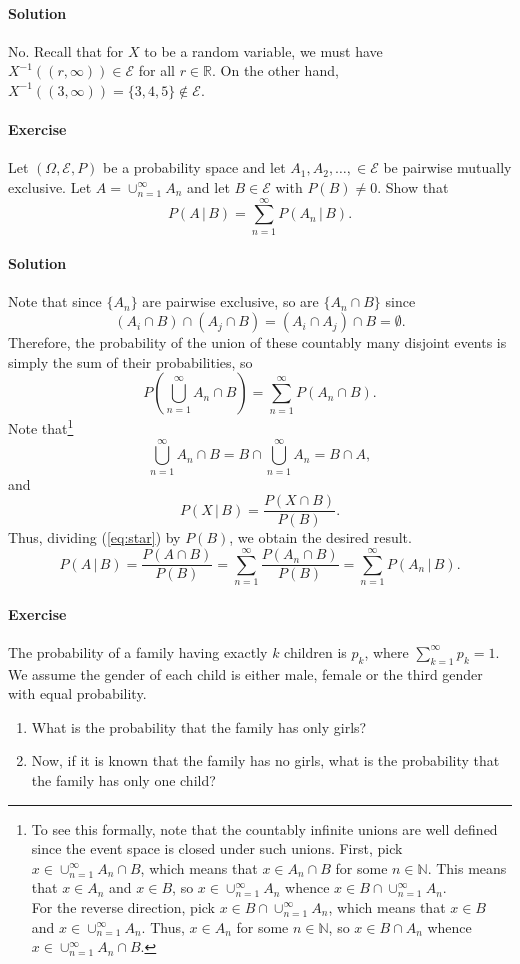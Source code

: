 \documentclass[10pt]{article}
\newcounter{prob}
\def\problem{\stepcounter{prob}\paragraph{Exercise \arabic{prob}}}
\def\solution{\paragraph{Solution}}
\begin{document}
        \solution No. Recall that for $X$ to be a random variable, we must have
        $X^{-1}((r, \infty)) \in \mathcal{E}$ for all $r \in \mathbb{R}$. On the
        other hand, $X^{-1}((3, \infty)) = \{3, 4, 5\} \notin \mathcal{E}$.

        \problem Let $(\Omega, \mathcal{E}, P)$ be a probability space and let $A_1,
        A_2, \dots, \in \mathcal{E}$ be pairwise mutually exclusive. Let $A =
        \cup_{n = 1}^\infty A_n$ and let $B \in \mathcal{E}$ with $P(B) \neq 0$.
        Show that \[
            P(A\,|\, B) = \sum_{n = 1}^\infty P(A_n\,|\,B).
        \] 
        
        \solution Note that since $\{A_n\}$ are pairwise exclusive, so are $\{A_n
        \cap B\}$ since \[
            (A_i \cap B) \cap (A_j \cap B) = (A_i \cap A_j) \cap B = \emptyset.
        \] Therefore, the probability of the union of these countably many disjoint
        events is simply the sum of their probabilities, so \[
            P\left(\bigcup_{n = 1}^\infty A_n \cap B\right) = \sum_{n = 1}^\infty
            P(A_n \cap B). \tag{\star}\label{eq:star}
            \] Note that\footnote{
                To see this formally, note that the countably infinite unions are
                well defined since the event space is closed under such unions.
                First, pick $x \in \cup_{n = 1}^\infty A_n \cap B$, which means that
                $x \in A_n \cap B$ for some $n \in \mathbb{N}$. This means that $x
                \in A_n$ and $x \in B$, so $x \in \cup_{n = 1}^\infty A_n$ whence $x
                \in B \cap \cup_{n = 1}^\infty A_n$. \\

                For the reverse direction, pick $x \in B \cap \cup_{n = 1}^\infty
                A_n$, which means that $x \in B$ and $x \in \cup_{n = 1}^\infty
                A_n$. Thus, $x \in A_n$ for some $n \in \mathbb{N}$, so $x \in B
                \cap A_n$ whence $x \in \cup_{n = 1}^\infty A_n \cap B$.
            } \[
            \bigcup_{n = 1}^\infty A_n \cap B = B \cap \bigcup_{n = 1}^\infty A_n =
            B \cap A,
        \] and \[
            P(X \,|\, B) = \frac{P(X \cap B)}{P(B)}.
        \] Thus, dividing (\ref{eq:star}) by $P(B)$, we obtain the desired result. \[
            P(A\,|\, B) = \frac{P(A \cap B)}{P(B)} = \sum_{n = 1}^\infty \frac{P(A_n
            \cap B)}{P(B)} = \sum_{n = 1}^\infty P(A_n\,|\,B).
        \] 


        \problem The probability of a family having exactly $k$ children is $p_k$,
        where $\sum_{k = 1}^\infty p_k = 1$. We assume the gender of each child
        is either male, female or the third gender with equal probability.
        \begin{enumerate}
            \itemsep0em
            \item What is the probability that the family has only girls?
            \item Now, if it is known that the family has no girls, what is the
            probability that the family has only one child?
        \end{enumerate}
\end{document}
